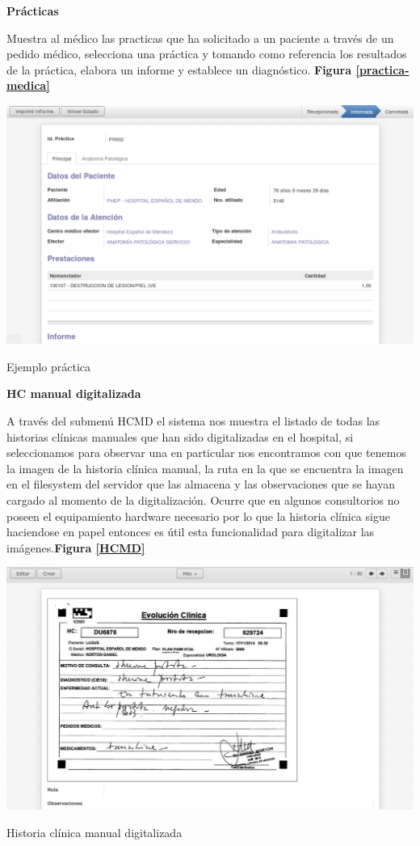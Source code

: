 \textbf{Prácticas}

Muestra al médico las practicas que ha solicitado a un paciente a través de un pedido médico, selecciona una práctica y tomando como referencia los resultados de la práctica, elabora un informe y establece un diagnóstico.
\textbf{Figura \ref{practica-medica}}

\begin{correccionFigure}
      \centering
      \includegraphics[width=.8\textwidth]{img/tp1/HE/Practica1}
      \caption{Ejemplo práctica}
      \label{practica-medica}
\end{correccionFigure}


\textbf{HC manual digitalizada}

A través del submenú HCMD el sistema nos muestra el listado de todas las historias clínicas manuales que han sido digitalizadas en el hospital, si seleccionamos para observar una en particular nos encontramos con que tenemos la imagen de la historia clínica manual, la ruta en la que se encuentra la imagen en el filesystem del servidor que las almacena y las observaciones que se hayan cargado al momento de la digitalización.
Ocurre que en algunos consultorios no poseen el equipamiento hardware necesario por lo que la historia clínica sigue haciendose en papel entonces es útil esta funcionalidad para digitalizar las imágenes.\textbf{Figura \ref{HCMD}}

\begin{correccionFigure}[ht]
      \centering
      \includegraphics[width=.8\textwidth]{img/tp1/HE/HCMDmanualdigital}
      \caption{Historia clínica manual digitalizada}
      \label{HCMD}
\end{correccionFigure}


